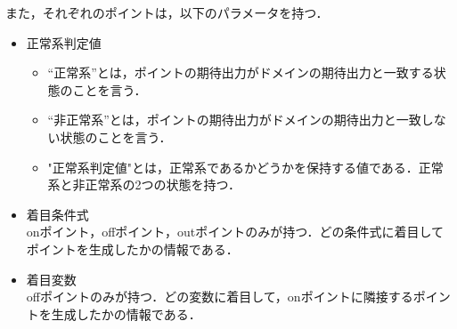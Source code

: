 \documentclass[uplatex, report, a4j, 10pt]{jsbook}
\begin{document}
また，それぞれのポイントは，以下のパラメータを持つ．
\begin{itemize}
  \item 正常系判定値
        \begin{itemize}
          \item “正常系”とは，ポイントの期待出力がドメインの期待出力と一致する状態のことを言う．
          \item “非正常系”とは，ポイントの期待出力がドメインの期待出力と一致しない状態のことを言う．
          \item "正常系判定値"とは，正常系であるかどうかを保持する値である．正常系と非正常系の2つの状態を持つ．
        \end{itemize}
  \item 着目条件式\\
        onポイント，offポイント，outポイントのみが持つ．どの条件式に着目してポイントを生成したかの情報である．
  \item 着目変数\\
        offポイントのみが持つ．どの変数に着目して，onポイントに隣接するポイントを生成したかの情報である．
\end{itemize}
\end{document}
